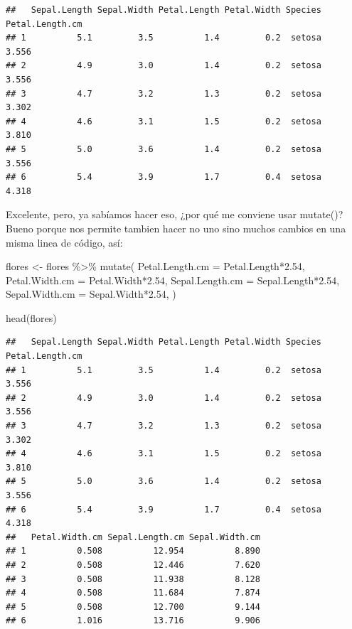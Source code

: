 \documentclass[
]{book}
\newenvironment{Shaded}{\begin{snugshade}}{\end{snugshade}}
\newcommand{\AttributeTok}[1]{\textcolor[rgb]{0.77,0.63,0.00}{#1}}
\newcommand{\FloatTok}[1]{\textcolor[rgb]{0.00,0.00,0.81}{#1}}
\newcommand{\FunctionTok}[1]{\textcolor[rgb]{0.00,0.00,0.00}{#1}}
\newcommand{\NormalTok}[1]{#1}
\newcommand{\OtherTok}[1]{\textcolor[rgb]{0.56,0.35,0.01}{#1}}
\newcommand{\SpecialCharTok}[1]{\textcolor[rgb]{0.00,0.00,0.00}{#1}}
\begin{document}
\begin{verbatim}
##   Sepal.Length Sepal.Width Petal.Length Petal.Width Species Petal.Length.cm
## 1          5.1         3.5          1.4         0.2  setosa           3.556
## 2          4.9         3.0          1.4         0.2  setosa           3.556
## 3          4.7         3.2          1.3         0.2  setosa           3.302
## 4          4.6         3.1          1.5         0.2  setosa           3.810
## 5          5.0         3.6          1.4         0.2  setosa           3.556
## 6          5.4         3.9          1.7         0.4  setosa           4.318
\end{verbatim}

Excelente, pero, ya sabíamos hacer eso, ¿por qué me conviene usar mutate()? Bueno porque nos permite tambien hacer no uno sino muchos cambios en una misma linea de código, así:

\begin{Shaded}
\begin{Highlighting}[]
\NormalTok{flores }\OtherTok{\textless{}{-}}\NormalTok{ flores }\SpecialCharTok{\%\textgreater{}\%} \FunctionTok{mutate}\NormalTok{( }\AttributeTok{Petal.Length.cm =}\NormalTok{ Petal.Length}\SpecialCharTok{*}\FloatTok{2.54}\NormalTok{,}
                             \AttributeTok{Petal.Width.cm =}\NormalTok{ Petal.Width}\SpecialCharTok{*}\FloatTok{2.54}\NormalTok{,}
                             \AttributeTok{Sepal.Length.cm =}\NormalTok{ Sepal.Length}\SpecialCharTok{*}\FloatTok{2.54}\NormalTok{,}
                             \AttributeTok{Sepal.Width.cm =}\NormalTok{ Sepal.Width}\SpecialCharTok{*}\FloatTok{2.54}\NormalTok{,}
\NormalTok{                             )}

\FunctionTok{head}\NormalTok{(flores)}
\end{Highlighting}
\end{Shaded}

\begin{verbatim}
##   Sepal.Length Sepal.Width Petal.Length Petal.Width Species Petal.Length.cm
## 1          5.1         3.5          1.4         0.2  setosa           3.556
## 2          4.9         3.0          1.4         0.2  setosa           3.556
## 3          4.7         3.2          1.3         0.2  setosa           3.302
## 4          4.6         3.1          1.5         0.2  setosa           3.810
## 5          5.0         3.6          1.4         0.2  setosa           3.556
## 6          5.4         3.9          1.7         0.4  setosa           4.318
##   Petal.Width.cm Sepal.Length.cm Sepal.Width.cm
## 1          0.508          12.954          8.890
## 2          0.508          12.446          7.620
## 3          0.508          11.938          8.128
## 4          0.508          11.684          7.874
## 5          0.508          12.700          9.144
## 6          1.016          13.716          9.906
\end{verbatim}
\end{document}
